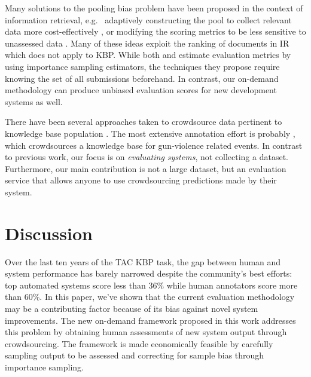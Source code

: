 Many solutions to the pooling bias problem have been proposed in the context of information retrieval, e.g.\ 
  adaptively constructing the pool to collect relevant data more cost-effectively \citep{zobel1998reliable,cormack1998efficient,aslam2006statistical}, or
  modifying the scoring metrics to be less sensitive to unassessed data \citep{buckley2004incomplete,sakai2008information,aslam2006statistical}.
Many of these ideas exploit the ranking of documents in IR which does not apply to KBP.\@
While both \citet{aslam2006statistical} and \citet{yilmaz2008simple} estimate evaluation metrics by using importance sampling estimators, the techniques they propose require knowing the set of all submissions beforehand.
In contrast, our on-demand methodology can produce unbiased evaluation scores for new development systems as well.

There have been several approaches taken to crowdsource data pertinent to knowledge base population \citep{vannella2014validating,angeli2014combining,he2015question,liu2016effective}.
The most extensive annotation effort is probably \citet{pavlick2016gun}, which crowdsources a knowledge base for gun-violence related events.
In contrast to previous work, our focus is on \textit{evaluating systems}, not collecting a dataset.
Furthermore, our main contribution is not a large dataset, but an evaluation service that allows anyone to use crowdsourcing predictions made by their system. 

\section{Discussion}
\label{sec:discussion}

Over the last ten years of the TAC KBP task, the gap between human and system performance has barely narrowed despite the community's best efforts: top automated systems score less than 36\% \fone{} while human annotators score more than 60\%.
In this paper, we've shown that the current evaluation methodology may be a contributing factor because of its bias against novel system improvements.
The new on-demand framework proposed in this work addresses this problem by obtaining human assessments of new system output through crowdsourcing.
The framework is made economically feasible by carefully sampling output to be assessed and correcting for sample bias through importance sampling.

